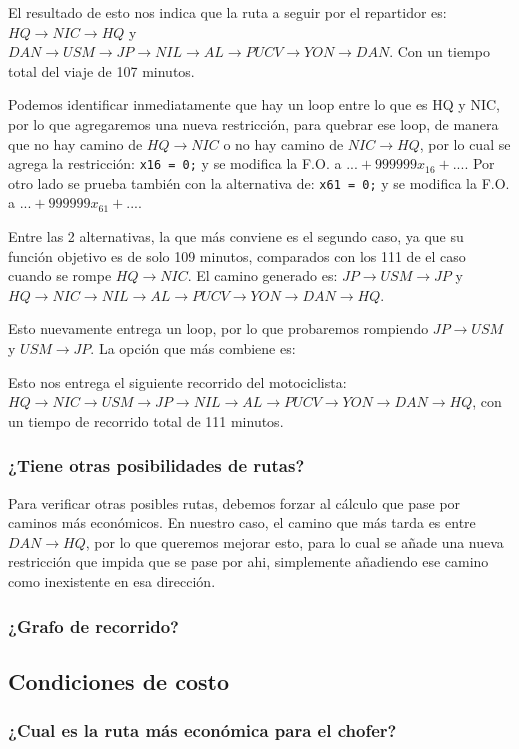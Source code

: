 \documentclass[12pt,letterpaper]{article}
\begin{document}
El resultado de esto nos indica que la ruta a seguir por el repartidor es:
$HQ \to NIC \to HQ$ y $DAN \to USM \to JP \to NIL \to AL \to PUCV \to YON \to DAN$. Con un tiempo total del viaje
de 107 minutos.

Podemos identificar inmediatamente que hay un loop entre lo que es HQ y NIC, por lo que agregaremos una nueva restricción, para quebrar ese loop, de manera que no hay camino de $HQ \to NIC$ o no hay camino de $NIC \to HQ$, por lo cual se agrega la restricción: \verb+x16 = 0;+ y se modifica la F.O. a $... + 999999 x_{16} + ...$. Por otro lado se prueba también con la alternativa de: \verb+x61 = 0;+ y se modifica la F.O. a $... + 999999 x_{61} + ...$.

Entre las 2 alternativas, la que más conviene es el segundo caso, ya que su función objetivo es de solo 109 minutos, comparados con los 111 de el caso cuando se rompe $HQ \to NIC$. El camino generado es: 
$JP \to USM \to JP$ y $HQ \to NIC \to NIL \to AL \to PUCV \to YON \to DAN \to HQ$.

Esto nuevamente entrega un loop, por lo que probaremos rompiendo $JP \to USM$ y $USM \to JP$. La opción que más combiene es:

Esto nos entrega el siguiente recorrido del motociclista: $HQ \to NIC \to USM \to JP \to NIL \to AL \to PUCV \to YON \to DAN \to HQ$, con un tiempo de recorrido total de 111 minutos.

\subsubsection{¿Tiene otras posibilidades de rutas?}
Para verificar otras posibles rutas, debemos forzar al cálculo que pase por caminos más económicos. En nuestro caso, el camino que más tarda es entre $DAN \to HQ$, por lo que queremos mejorar esto, para lo cual se añade una nueva restricción que impida que se pase por ahi, simplemente añadiendo ese camino como inexistente en esa dirección.
\subsubsection{¿Grafo de recorrido?}

\subsection{Condiciones de costo}
\subsubsection{¿Cual es la ruta más económica para el chofer?}





\end{document}
